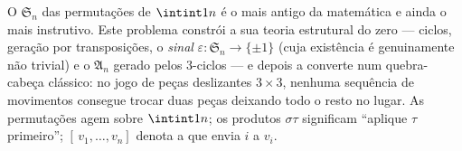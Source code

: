 \begin{problem}\label{pb:b1:structures:1}
O  $\mathfrak S_n$ das permutações de $\intint1n$ é o
 mais antigo da matemática e ainda o mais instrutivo. Este
problema constrói a sua teoria estrutural do zero --- ciclos,
geração por transposições, o  \emph{sinal}
$\varepsilon \colon \mathfrak S_n \to \{\pm1\}$ (cuja existência é
genuinamente não trivial) e o  $\mathfrak A_n$
gerado pelos $3$-ciclos --- e depois a converte num quebra-cabeça
clássico: no jogo de peças deslizantes $3 \times 3$, nenhuma sequência de
movimentos consegue trocar duas peças deixando todo o resto no lugar.
As permutações agem sobre $\intint1n$; os produtos $\sigma\tau$ significam
``aplique $\tau$ primeiro''; $[\,v_1, \dots, v_n]$ denota a
 que envia $i$ a $v_i$.


\end{problem}
